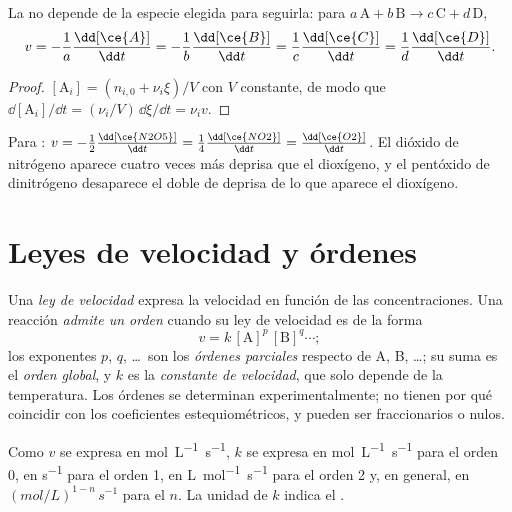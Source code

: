\begin{proposition}\label{prop:b1:rate-laws:rate-relations}
La  no depende de la especie elegida para seguirla:
para $a\,\mathrm{A} + b\,\mathrm{B} \longrightarrow c\,\mathrm{C} + d\,\mathrm{D}$,
\[
  v = -\frac1a\frac{\dd[\ce{A}]}{\dd t} = -\frac1b\frac{\dd[\ce{B}]}{\dd t}
  = \frac1c\frac{\dd[\ce{C}]}{\dd t} = \frac1d\frac{\dd[\ce{D}]}{\dd t} .
\]
\end{proposition}

\begin{proof}
$[\mathrm{A}_i] = (n_{i,0} + \nu_i\xi)/V$ con $V$ constante, de modo que
$\dd[\mathrm{A}_i]/\dd t = (\nu_i/V)\,\dd\xi/\dd t = \nu_i v$.
\end{proof}

\begin{example}\label{ex:b1:rate-laws:n2o5}
Para : $v = -\frac12\frac{\dd[\ce{N2O5}]}{\dd t} =
\frac14\frac{\dd[\ce{NO2}]}{\dd t} = \frac{\dd[\ce{O2}]}{\dd t}$. El
dióxido de nitrógeno aparece cuatro veces más deprisa que el dioxígeno, y
el pentóxido de dinitrógeno desaparece el doble de deprisa de lo que
aparece el dioxígeno.
\end{example}

\section{Leyes de velocidad y órdenes}

\begin{definition}\label{def:b1:rate-laws:order}
Una \emph{ley de velocidad} expresa la velocidad en
función de las concentraciones. Una reacción \emph{admite un orden} cuando
su ley de velocidad es de la forma
\[
  v = k\,[\mathrm{A}]^{p}\,[\mathrm{B}]^{q} \cdots ;
\]
los exponentes $p$, $q$, \dots\ son los \emph{órdenes parciales}
respecto de A, B, \dots; su suma es el \emph{orden
global}, y $k$ es la \emph{constante de velocidad},
que solo depende de la temperatura. Los órdenes se determinan
experimentalmente; no tienen por qué coincidir con los coeficientes
estequiométricos, y pueden ser fraccionarios o nulos.
\end{definition}

\begin{remark}[Unidades de $k$]\label{rem:b1:rate-laws:units}
Como $v$ se expresa en \unit{mol.L^{-1}.s^{-1}}, $k$ se expresa en
\unit{mol.L^{-1}.s^{-1}} para el orden 0, en \unit{s^{-1}} para el orden
1, en \unit{L.mol^{-1}.s^{-1}} para el orden 2 y, en general, en
$(\unit{mol/L})^{1-n}\,\unit{s^{-1}}$ para el  $n$. La unidad
de $k$ indica el .
\end{remark}

